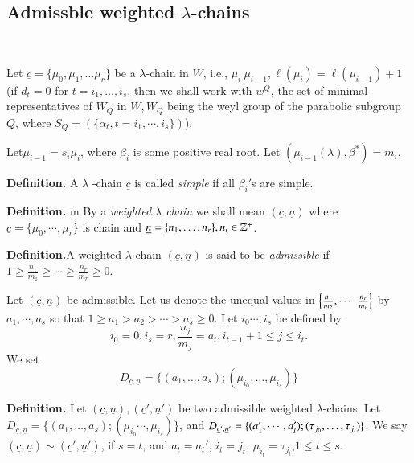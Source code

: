 \medskip
\subsection*{Admissble weighted \boldmath$\lambda$-chains}
~

\smallskip
\noindent
Let $\underline{c}= \{ \mu_{0}, \mu_{1}, \ldots \mu_{r}\}$ be a $\lambda$-chain in $W$, i.e., $\mu_{i} \> \mu_{i-1}, \ell(\mu_{i}) = \ell(\mu_{i-1})+1$ (if $d_{t}=0$ for $t = i_{1}, \ldots, i_{s}$, then we shall work with $w^{Q}$, the set of minimal representatives of $W_{Q}$ in $W, W_{Q}$ being the weyl group of the parabolic subgroup $Q$, where $S_{Q}=(\{\alpha_{t}, t= i_{1}, \cdots, i_{s}\})$). 

Let\pageoriginale $\mu_{i-1}= s_{i}\mu_{i}$, where $\beta_{i}$ is some positive real root. Let $(\mu_{i-1}(\lambda), \beta^{*}) = m_{i}$.

\noindent
{\bfseries {} Definition.}\label{A. 1. definition.} A $\lambda$ -chain $\underline{c}$ is called \textit{simple} if all $\beta_{i}'$s are simple. 

\medskip
\noindent
{\bfseries {} Definition.}\label{A. 2. definition.} m By a \textit{weighted $\lambda$ chain} we shall mean $(\underline{c}, \underline{n})$ where $\underline{c}= \{ \mu_{0}, \cdots, \mu_{r}\}$ is chain and $\underline{n} =\{n_{1}, \ldots, n_{r}\}, n_{i} \in \mathbb{Z}^{+}$.

\medskip
\noindent
{\bfseries {} Definition.}\label{A. 3. definition.}A weighted $\lambda$-chain $(\underline{c}, \underline{n})$ is said to be \textit{admissible} if $1 \geq \frac{n_{1}}{m_{1}}\geq \cdots \geq \frac{n_{r}}{m_{r}} \geq 0$.

Let $(\underline{c}, \underline{n})$ be admissible. Let us denote the unequal values in $\left\{\frac{n_{1}}{m_{2}}, \cdots\right.\break \left. \frac{n_{r}}{m_{r}}\right\}$ by $a_{1}, \cdots, a_{s}$ so that $1 \geq a_{1}> a_{2} > \cdots > a_{s} \geq 0$. Let $i_{0}\cdots, i_{s}$ be defined by
$$
i_{0}=0, i_{s}=r, \frac{n_{j}}{m_{j}} = a_{t}, i_{t-1}+1 \leq j \leq i_{t}.
$$
We set
$$
D_{\underline{c}, \underline{n}} = \{(a_{1}, \ldots, a_{s});(\mu_{i_{0}},\ldots,\mu_{i_{s}})\}
$$

\medskip
\noindent
{\bfseries {} Definition.}\label{A. 4. definition.} Let $(\underline{c}, \underline{n}), (\underline{c}', \underline{n}')$ be two admissible weighted $\lambda$-chains. Let $D_{\underline{c}, \underline{n}} =\{(a_{1}, \ldots, a_{s});(\mu_{i_{0}}\cdots,\mu_{i_{s}})\}$, and $ D_{\underline{c}', \underline{n}'} = \{(a_{1}', \cdots, a_{l}');\break (\tau_{j_{0}}, \ldots, \tau_{j_{l}})\}$. We say $(\underline{c}, \underline{n}) \sim (\underline{c}',\underline{n}')$, if $s =t$, and $a_{t}=a_{t}'$, $i_{t}=j_{t}$, $\mu_{i_{t}} = \tau_{j_{t}}$,$1 \leq t \leq s$.

